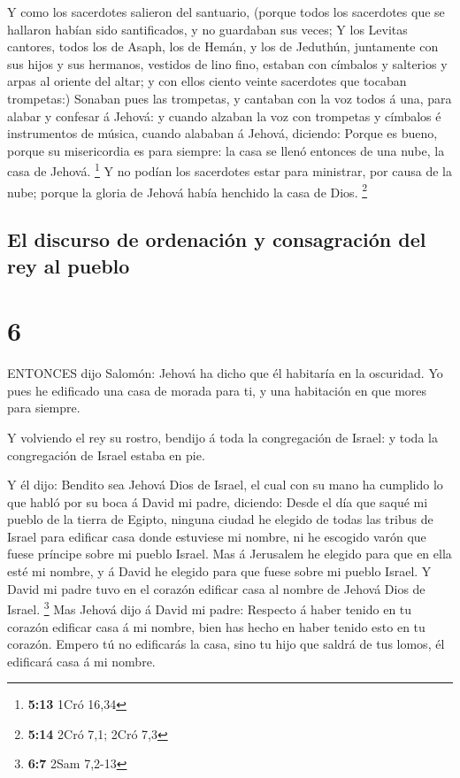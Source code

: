  Y como los sacerdotes salieron del santuario, (porque
todos los sacerdotes que se hallaron habían sido santificados, y no
guardaban sus veces;  Y los Levitas cantores, todos los de
Asaph, los de Hemán, y los de Jeduthún, juntamente con sus hijos y sus
hermanos, vestidos de lino fino, estaban con címbalos y salterios y
arpas al oriente del altar; y con ellos ciento veinte sacerdotes que
tocaban trompetas:)  Sonaban pues las trompetas, y cantaban
con la voz todos á una, para alabar y confesar á Jehová: y cuando
alzaban la voz con trompetas y címbalos é instrumentos de música, cuando
alababan á Jehová, diciendo: Porque es bueno, porque su misericordia es
para siempre: la casa se llenó entonces de una nube, la casa de Jehová.
\footnote{\textbf{5:13} 1Cró 16,34}  Y no podían los
sacerdotes estar para ministrar, por causa de la nube; porque la gloria
de Jehová había henchido la casa de Dios. \footnote{\textbf{5:14} 2Cró
  7,1; 2Cró 7,3}

\hypertarget{el-discurso-de-ordenaciuxf3n-y-consagraciuxf3n-del-rey-al-pueblo}{%
\subsection{El discurso de ordenación y consagración del rey al
pueblo}\label{el-discurso-de-ordenaciuxf3n-y-consagraciuxf3n-del-rey-al-pueblo}}

\hypertarget{section-5}{%
\section{6}\label{section-5}}

 ENTONCES dijo Salomón: Jehová ha dicho que él habitaría en
la oscuridad.  Yo pues he edificado una casa de morada para
ti, y una habitación en que mores para siempre.

 Y volviendo el rey su rostro, bendijo á toda la
congregación de Israel: y toda la congregación de Israel estaba en pie.

 Y él dijo: Bendito sea Jehová Dios de Israel, el cual con
su mano ha cumplido lo que habló por su boca á David mi padre, diciendo:
 Desde el día que saqué mi pueblo de la tierra de Egipto,
ninguna ciudad he elegido de todas las tribus de Israel para edificar
casa donde estuviese mi nombre, ni he escogido varón que fuese príncipe
sobre mi pueblo Israel.  Mas á Jerusalem he elegido para que
en ella esté mi nombre, y á David he elegido para que fuese sobre mi
pueblo Israel.  Y David mi padre tuvo en el corazón edificar
casa al nombre de Jehová Dios de Israel. \footnote{\textbf{6:7} 2Sam
  7,2-13}  Mas Jehová dijo á David mi padre: Respecto á
haber tenido en tu corazón edificar casa á mi nombre, bien has hecho en
haber tenido esto en tu corazón.  Empero tú no edificarás la
casa, sino tu hijo que saldrá de tus lomos, él edificará casa á mi
nombre.

